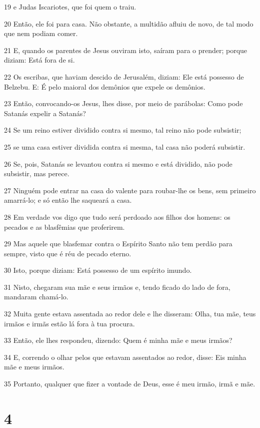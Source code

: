 \par 19 e Judas Iscariotes, que foi quem o traiu.
\par 20 Então, ele foi para casa. Não obstante, a multidão afluiu de novo, de tal modo que nem podiam comer.
\par 21 E, quando os parentes de Jesus ouviram isto, saíram para o prender; porque diziam: Está fora de si.
\par 22 Os escribas, que haviam descido de Jerusalém, diziam: Ele está possesso de Belzebu. E: É pelo maioral dos demônios que expele os demônios.
\par 23 Então, convocando-os Jesus, lhes disse, por meio de parábolas: Como pode Satanás expelir a Satanás?
\par 24 Se um reino estiver dividido contra si mesmo, tal reino não pode subsistir;
\par 25 se uma casa estiver dividida contra si mesma, tal casa não poderá subsistir.
\par 26 Se, pois, Satanás se levantou contra si mesmo e está dividido, não pode subsistir, mas perece.
\par 27 Ninguém pode entrar na casa do valente para roubar-lhe os bens, sem primeiro amarrá-lo; e só então lhe saqueará a casa.
\par 28 Em verdade vos digo que tudo será perdoado aos filhos dos homens: os pecados e as blasfêmias que proferirem.
\par 29 Mas aquele que blasfemar contra o Espírito Santo não tem perdão para sempre, visto que é réu de pecado eterno.
\par 30 Isto, porque diziam: Está possesso de um espírito imundo.
\par 31 Nisto, chegaram sua mãe e seus irmãos e, tendo ficado do lado de fora, mandaram chamá-lo.
\par 32 Muita gente estava assentada ao redor dele e lhe disseram: Olha, tua mãe, teus irmãos e irmãs estão lá fora à tua procura.
\par 33 Então, ele lhes respondeu, dizendo: Quem é minha mãe e meus irmãos?
\par 34 E, correndo o olhar pelos que estavam assentados ao redor, disse: Eis minha mãe e meus irmãos.
\par 35 Portanto, qualquer que fizer a vontade de Deus, esse é meu irmão, irmã e mãe.

\chapter{4}


